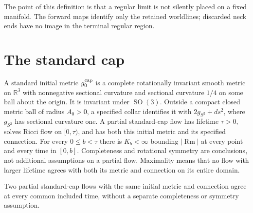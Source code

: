 The point of this definition is that a regular limit is not silently placed
on a fixed manifold.  The forward maps identify only the retained worldlines;
discarded neck ends have no image in the terminal regular region.

\section{The standard cap}
\label{sec:standard-cap}

\begin{definition}
\label{def:standard-initial-metric}
A standard initial metric $g_0^{\rm cap}$ is a complete rotationally invariant
smooth metric on $\mathbb R^3$ with nonnegative sectional curvature and
sectional curvature $1/4$ on some ball about the origin.  It is invariant
under $\operatorname{SO}(3)$.  Outside a compact closed metric ball of radius
$A_0>0$, a specified collar identifies it with
$2g_{S^2}+ds^2$, where $g_{S^2}$ has sectional curvature one.
A partial standard-cap flow has lifetime $\tau>0$, solves Ricci flow on
$[0,\tau)$, and has both this initial metric and its specified connection.
For every $0\leq b<\tau$ there is $K_b<\infty$ bounding
$|\operatorname{Rm}|$ at every point and every time in $[0,b]$.
Completeness and rotational symmetry are conclusions, not additional
assumptions on a partial flow.  Maximality means that no flow with larger
lifetime agrees with both its metric and connection on its entire domain.
\cite[Definition 12.1, pp. 293--294]{MT2007}
\end{definition}

\begin{lemma}
\label{lem:cap-common-uniqueness}
Two partial standard-cap flows with the same initial metric and connection
agree at every common included time, without a separate completeness
or symmetry assumption.
\cite[Section 12.5, pp. 309--319]{MT2007}
\end{lemma}

